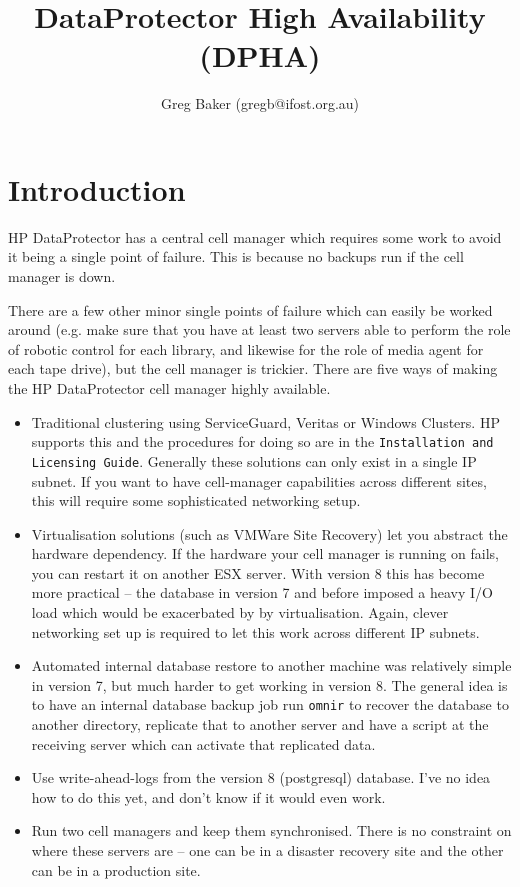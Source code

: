 \documentclass{article}
\title{DataProtector High Availability (DPHA)}
\author{Greg Baker (gregb@ifost.org.au)}
\begin{document}
\maketitle
\tableofcontents

\section*{Introduction}

HP DataProtector has a central cell manager which requires some work to avoid it being a single point of failure. This is because no backups run if the cell manager is down. 

There are a few other minor single points of failure which can easily be worked around (e.g. make sure that you have at least two servers able to perform the role of robotic control for each library, and likewise for the role of media agent for each tape drive), but the cell manager is trickier. There are five ways of making the HP DataProtector cell manager highly available. 

\begin{itemize}
\item Traditional clustering using ServiceGuard, Veritas or Windows Clusters. HP supports this and the procedures for doing so are in the {\tt Installation and Licensing Guide}. Generally these solutions can only exist in a single IP subnet. If you want to have cell-manager capabilities across different sites, this will require some sophisticated networking setup.

\item Virtualisation solutions (such as VMWare Site Recovery) let you abstract the hardware dependency. If the hardware your cell manager is running on fails, you can restart it on another 
ESX server. With version 8 this has become more practical -- the database in version 7 and before imposed a heavy I/O load which would be exacerbated by by virtualisation. Again, 
clever networking set up is required to let this work across different IP subnets.

\item Automated internal database restore to another machine was relatively simple in version 7, but much harder to get working in version 8. The general idea is to have an internal database
backup job run {\tt omnir} to recover the database to another directory, replicate that to another server and have a script at the receiving server which can activate that replicated data. 

\item Use write-ahead-logs from the version 8 (postgresql) database. I've no idea how to do this yet, and don't know if it would even work.

\item Run two cell managers and keep them synchronised. There is no constraint on where these servers are -- one can be in a disaster recovery site and the other can be in a production site.

\end{itemize}
\end{document}
